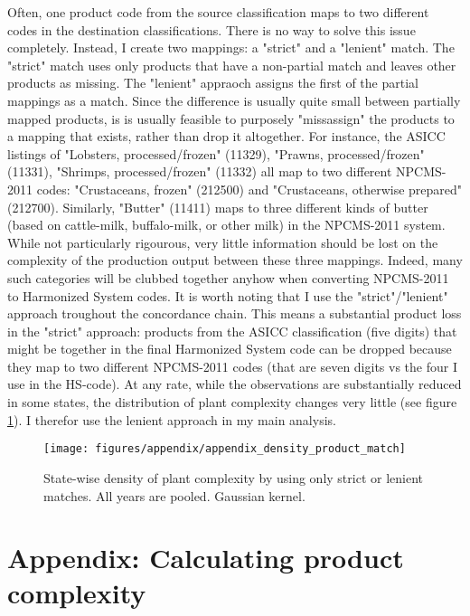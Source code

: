 \documentclass[11pt]{article}
\begin{document}
\begin{appendices}
Often, one product code from the source classification maps to two different codes in the destination classifications. There is no way to solve this issue completely. Instead, I create two mappings: a "strict" and a "lenient" match. The "strict" match uses only products that have a non-partial match and leaves other products as missing. The "lenient" appraoch assigns the first of the partial mappings as a match. Since the difference is usually quite small between partially mapped products, is is usually feasible to purposely "missassign" the products to a mapping that exists, rather than drop it altogether. For instance, the ASICC listings of "Lobsters, processed/frozen" (11329), "Prawns, processed/frozen" (11331), "Shrimps, processed/frozen" (11332) all map to two different NPCMS-2011 codes: "Crustaceans, frozen" (212500) and "Crustaceans, otherwise prepared" (212700). Similarly, "Butter" (11411) maps to three different kinds of butter (based on cattle-milk, buffalo-milk, or other milk) in the NPCMS-2011 system. While not particularly rigourous, very little information should be lost on the complexity of the production output between these three mappings. Indeed, many such categories will be clubbed together anyhow when converting NPCMS-2011 to Harmonized System codes. It is worth noting that I use the "strict"/"lenient" approach troughout the concordance chain. This means a substantial product loss in the "strict" approach: products from the ASICC classification (five digits) that might be together in the final Harmonized System code can be dropped because they map to two different NPCMS-2011 codes (that are seven digits vs the four I use in the HS-code). At any rate, while the observations are substantially reduced in some states, the distribution of plant complexity changes very little (see figure \ref{fig:density_product_match}). I therefor use the lenient approach in my main analysis.

\begin{figure}[htpb]
	\centering
	\texttt{[image: figures/appendix/appendix\_density\_product\_match]}
	\caption[State-wise density of plant-complexity by strict or lenient product matching]{State-wise density of plant complexity by using only strict or lenient matches. All years are pooled. Gaussian kernel.}%
	\label{fig:density_product_match}
\end{figure}

\newpage

\section{Appendix: Calculating product complexity}%
\label{sub:economic_complexity_appendix}


\end{appendices}
\end{document}
